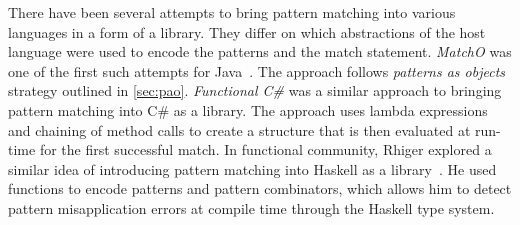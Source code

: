 There have been several attempts to bring pattern matching into various 
languages in a form of a library. They differ on which abstractions of the host 
language were used to encode the patterns and the match statement. \emph{MatchO} was one of the first 
such attempts for Java~\cite{Visser06matchingobjects}. The approach follows 
\emph{patterns as objects} strategy outlined in \textsection\ref{sec:pao}.
%
\emph{Functional C\#} was a similar approach to bringing pattern matching into 
C\# as a library\cite{FuncCSharp}. The approach uses lambda expressions and 
chaining of method calls to create a structure that is then evaluated at 
run-time for the first successful match. %
%
In functional community, Rhiger explored a similar idea of introducing pattern 
matching into Haskell as a library~\cite{Rhiger09}. He used functions to encode 
patterns and pattern combinators, which allows him to detect pattern 
misapplication errors at compile time through the Haskell type system. 
